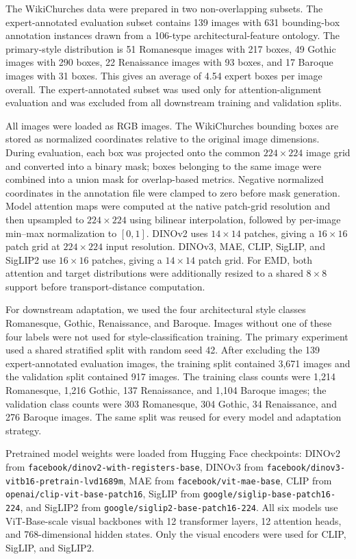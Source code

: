\documentclass[lineno,pdflatex,sn-mathphys-num]{sn-jnl}%
\theoremstyle{thmstyleone}%
\theoremstyle{thmstyletwo}%
\theoremstyle{thmstylethree}%
\begin{document}
The WikiChurches data were prepared in two non-overlapping subsets. The expert-annotated evaluation subset contains 139 images with 631 bounding-box annotation instances drawn from a 106-type architectural-feature ontology. The primary-style distribution is 51 Romanesque images with 217 boxes, 49 Gothic images with 290 boxes, 22 Renaissance images with 93 boxes, and 17 Baroque images with 31 boxes. This gives an average of 4.54 expert boxes per image overall. The expert-annotated subset was used only for attention-alignment evaluation and was excluded from all downstream training and validation splits.

All images were loaded as RGB images. The WikiChurches bounding boxes are stored as normalized coordinates relative to the original image dimensions. During evaluation, each box was projected onto the common $224 \times 224$ image grid and converted into a binary mask; boxes belonging to the same image were combined into a union mask for overlap-based metrics. Negative normalized coordinates in the annotation file were clamped to zero before mask generation. Model attention maps were computed at the native patch-grid resolution and then upsampled to $224 \times 224$ using bilinear interpolation, followed by per-image min--max normalization to $[0,1]$. DINOv2 uses $14 \times 14$ patches, giving a $16 \times 16$ patch grid at $224 \times 224$ input resolution. DINOv3, MAE, CLIP, SigLIP, and SigLIP2 use $16 \times 16$ patches, giving a $14 \times 14$ patch grid. For EMD, both attention and target distributions were additionally resized to a shared $8 \times 8$ support before transport-distance computation.

For downstream adaptation, we used the four architectural style classes Romanesque, Gothic, Renaissance, and Baroque. Images without one of these four labels were not used for style-classification training. The primary experiment used a shared stratified split with random seed 42. After excluding the 139 expert-annotated evaluation images, the training split contained 3,671 images and the validation split contained 917 images. The training class counts were 1,214 Romanesque, 1,216 Gothic, 137 Renaissance, and 1,104 Baroque images; the validation class counts were 303 Romanesque, 304 Gothic, 34 Renaissance, and 276 Baroque images. The same split was reused for every model and adaptation strategy.

Pretrained model weights were loaded from Hugging Face checkpoints: DINOv2 from \texttt{facebook/dinov2-with-registers-base}, DINOv3 from \texttt{facebook/dinov3-vitb16-pretrain-lvd1689m}, MAE from \texttt{facebook/vit-mae-base}, CLIP from \texttt{openai/clip-vit-base-patch16}, SigLIP from \texttt{google/siglip-base-patch16-224}, and SigLIP2 from \texttt{google/siglip2-base-patch16-224}. All six models use ViT-Base-scale visual backbones with 12 transformer layers, 12 attention heads, and 768-dimensional hidden states. Only the visual encoders were used for CLIP, SigLIP, and SigLIP2.
\end{document}
